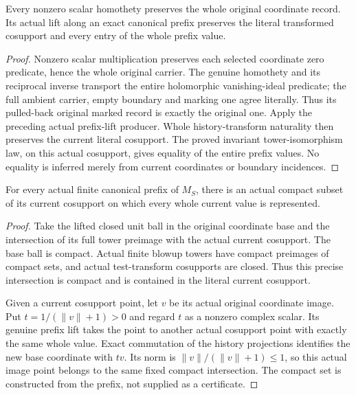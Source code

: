 \begin{lemma}
\label{hir:homogeneous-model-entire-record-and-prefix-value}
Every nonzero scalar homothety preserves the whole original coordinate
record. Its actual lift along an exact canonical prefix preserves the
literal transformed cosupport and every entry of the whole prefix value.
\leanok
{}
\end{lemma}
\begin{proof}
Nonzero scalar multiplication preserves each selected coordinate zero
predicate, hence the whole original carrier. The genuine homothety and
its reciprocal inverse transport the entire holomorphic vanishing-ideal
predicate; the full ambient carrier, empty boundary and marking one
agree literally. Thus its pulled-back original marked record is exactly
the original one. Apply the preceding actual prefix-lift producer.
Whole history-transform naturality then preserves the current literal
cosupport. The proved invariant tower-isomorphism law, on this actual
cosupport, gives equality of the entire prefix values. No equality is
inferred merely from current coordinates or boundary incidences.
\end{proof}

\begin{theorem}
\label{hir:homogeneous-model-proper-compact-value-representatives}
For every actual finite canonical prefix of $M_S$, there is an actual
compact subset of its current cosupport on which every whole current
value is represented.
\leanok
{}
\end{theorem}
\begin{proof}
Take the lifted closed unit ball in the original coordinate base and
the intersection of its full tower preimage with the actual current
cosupport. The base ball is compact. Actual finite blowup towers have
compact preimages of compact sets, and actual test-transform cosupports
are closed. Thus this precise intersection is compact and is contained
in the literal current cosupport.

Given a current cosupport point, let $v$ be its actual original coordinate
image. Put $t=1/(\lVert v\rVert+1)>0$ and regard $t$ as a nonzero complex
scalar. Its genuine prefix lift takes the point to another actual
cosupport point with exactly the same whole value. Exact commutation of
the history projections identifies the new base coordinate with $tv$.
Its norm is $\lVert v\rVert/(\lVert v\rVert+1)\leq1$, so this actual
image point belongs to the same fixed compact intersection. The compact
set is constructed from the prefix, not supplied as a certificate.
\end{proof}

